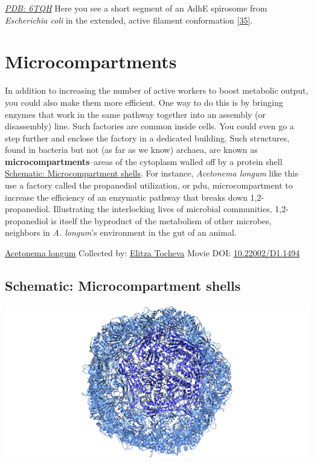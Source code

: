 \documentclass[]{tufte-book}
\begin{document}
\href{http://rcsb.org/structure/6TQH}{\emph{PDB: 6TQH}}
Here you see a short segment of an AdhE spirosome from \emph{Escherichia coli} in the extended, active filament conformation {[}\protect\hyperlink{ref-pony2020}{35}{]}.

\hypertarget{microcompartments}{%
\section{Microcompartments}\label{microcompartments}}

In addition to increasing the number of active workers to boost metabolic output, you could also make them more efficient. One way to do this is by bringing enzymes that work in the same pathway together into an assembly (or disassembly) line. Such factories are common inside cells. You could even go a step further and enclose the factory in a dedicated building. Such structures, found in bacteria but not (as far as we know) archaea, are known as \textbf{microcompartments}--areas of the cytoplasm walled off by a protein shell \protect\hyperlink{Microcompartment_shells}{Schematic: Microcompartment shells}. For instance, \emph{Acetonema longum} like this use a factory called the propanediol utilization, or pdu, microcompartment to increase the efficiency of an enzymatic pathway that breaks down 1,2-propanediol. Illustrating the interlocking lives of microbial communities, 1,2-propanediol is itself the byproduct of the metabolism of other microbes, neighbors in \emph{A. longum}'s environment in the gut of an animal.



\hypertarget{htmlwidget-282d6dce1abfa7f161bd}{}

\label{fig:4-6}\protect\hyperlink{tree}{Acetonema longum} Collected by: \protect\hyperlink{elitza_tocheva}{Elitza Tocheva} Movie DOI: \href{https://doi.org/10.22002/D1.1494}{10.22002/D1.1494}

\hypertarget{Microcompartment_shells}{%
\subsection*{Schematic: Microcompartment shells}\label{Microcompartment_shells}}

\includegraphics{img/schematics/4_6_1}
\end{document}
